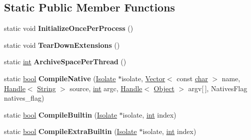 \subsection*{Static Public Member Functions}
\begin{DoxyCompactItemize}
\item 
\mbox{\label{classv8_1_1internal_1_1Bootstrapper_aebe5e8b735f78ccb34cdc57bd6af4167}} 
static void {\bfseries Initialize\+Once\+Per\+Process} ()
\item 
\mbox{\label{classv8_1_1internal_1_1Bootstrapper_a07307f7e4952c28bdd597e3839ea8d28}} 
static void {\bfseries Tear\+Down\+Extensions} ()
\item 
\mbox{\label{classv8_1_1internal_1_1Bootstrapper_af55e132f4a17a18aceb087688aea0291}} 
static \mbox{\hyperlink{classint}{int}} {\bfseries Archive\+Space\+Per\+Thread} ()
\item 
\mbox{\label{classv8_1_1internal_1_1Bootstrapper_ad79d369195f8e8e2a2dde472096566d3}} 
static \mbox{\hyperlink{classbool}{bool}} {\bfseries Compile\+Native} (\mbox{\hyperlink{classv8_1_1internal_1_1Isolate}{Isolate}} $\ast$isolate, \mbox{\hyperlink{classv8_1_1internal_1_1Vector}{Vector}}$<$ const \mbox{\hyperlink{classchar}{char}} $>$ name, \mbox{\hyperlink{classv8_1_1internal_1_1Handle}{Handle}}$<$ \mbox{\hyperlink{classv8_1_1internal_1_1String}{String}} $>$ source, \mbox{\hyperlink{classint}{int}} argc, \mbox{\hyperlink{classv8_1_1internal_1_1Handle}{Handle}}$<$ \mbox{\hyperlink{classv8_1_1internal_1_1Object}{Object}} $>$ argv\mbox{[}$\,$\mbox{]}, Natives\+Flag natives\+\_\+flag)
\item 
\mbox{\label{classv8_1_1internal_1_1Bootstrapper_a27be91672eb777b32c1432922da06ed3}} 
static \mbox{\hyperlink{classbool}{bool}} {\bfseries Compile\+Builtin} (\mbox{\hyperlink{classv8_1_1internal_1_1Isolate}{Isolate}} $\ast$isolate, \mbox{\hyperlink{classint}{int}} index)
\item 
\mbox{\label{classv8_1_1internal_1_1Bootstrapper_abb1990954b123388d01ed8bccb6f3d8f}} 
static \mbox{\hyperlink{classbool}{bool}} {\bfseries Compile\+Extra\+Builtin} (\mbox{\hyperlink{classv8_1_1internal_1_1Isolate}{Isolate}} $\ast$isolate, \mbox{\hyperlink{classint}{int}} index)

\end{DoxyCompactItemize}
